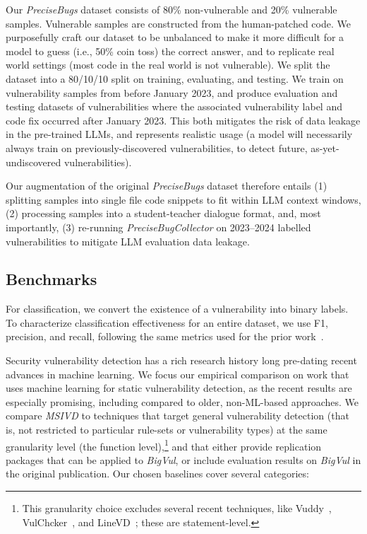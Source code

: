 \documentclass[12pt,openany,oneside,table]{cmuthesis}
\begin{document}
Our \textit{PreciseBugs} dataset consists of 80\% non-vulnerable and 20\% vulnerable samples. Vulnerable samples are constructed from the human-patched code. We purposefully craft our dataset to be unbalanced to make it more difficult for a model to guess (i.e., 50\% coin toss) the correct answer, and to replicate real world settings (most code in the real world is not vulnerable). 
We split the dataset into a 80/10/10 split on training, evaluating, and testing.
We train on vulnerability samples from before January 2023, and produce evaluation and testing datasets of vulnerabilities 
where the associated vulnerability label and code fix occurred after January 2023.  This both mitigates the risk of data leakage in the pre-trained LLMs, and represents realistic usage (a model will necessarily always train on previously-discovered vulnerabilities, to detect future, as-yet-undiscovered vulnerabilities). 

Our augmentation of the original \textit{PreciseBugs} dataset therefore entails (1) splitting samples into single file code snippets to fit within LLM context windows, (2) processing samples into a student-teacher dialogue format, and, most importantly, (3) re-running \textit{PreciseBugCollector} on 2023--2024 labelled vulnerabilities to mitigate LLM evaluation data leakage.


\subsection{Benchmarks}
\label{sec:baselines}

For classification, we convert the existence of a vulnerability into binary labels. To characterize classification effectiveness for an entire
dataset, we use F1, precision, and recall, following the same metrics used for the prior work~\cite{deepdfa, ivdetect, linevul, vuldeepecker}.

Security vulnerability detection has a rich research history long pre-dating recent advances in machine learning.
We focus our empirical comparison on work that uses machine learning for static vulnerability detection, as the recent results are especially promising, including compared to older, non-ML-based approaches. 
We compare \textit{MSIVD} to techniques that target general vulnerability detection (that is, not restricted to particular rule-sets or vulnerability types) at the same granularity level (the function level),\footnote{This granularity choice excludes several recent techniques, like Vuddy~\cite{vuddy}, VulChcker~\cite{vulchecker}, and LineVD~\cite{linevd}; these are statement-level.} and that either provide replication packages that can be applied to \textit{BigVul}, or include evaluation results on \textit{BigVul} in the original publication.  
Our chosen baselines cover several categories:
\end{document}
